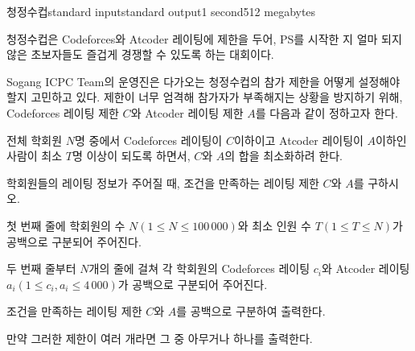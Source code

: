 \begin{problem}{청정수컵}{standard input}{standard output}{1 second}{512 megabytes}

청정수컵은 Codeforces와 Atcoder 레이팅에 제한을 두어, PS를 시작한 지 얼마 되지 않은 초보자들도 즐겁게 경쟁할 수 있도록 하는 대회이다. 

Sogang ICPC Team의 운영진은 다가오는 청정수컵의 참가 제한을 어떻게 설정해야 할지 고민하고 있다. 제한이 너무 엄격해 참가자가 부족해지는 상황을 방지하기 위해, Codeforces 레이팅 제한 $C$와 Atcoder 레이팅 제한 $A$를 다음과 같이 정하고자 한다.

전체 학회원 $N$명 중에서 Codeforces 레이팅이 $C$이하이고 Atcoder 레이팅이 $A$이하인 사람이 최소 $T$명 이상이 되도록 하면서, $C$와 $A$의 합을 최소화하려 한다.

학회원들의 레이팅 정보가 주어질 때, 조건을 만족하는 레이팅 제한 $C$와 $A$를 구하시오.

\InputFile
첫 번째 줄에 학회원의 수 $N(1 \le N \le 100\,000)$와 최소 인원 수 $T(1 \le T \le N)$가 공백으로 구분되어 주어진다.

두 번째 줄부터 $N$개의 줄에 걸쳐 각 학회원의 Codeforces 레이팅 $c_i$와 Atcoder 레이팅 $a_i(1 \le c_i, a_i \le 4\,000)$가 공백으로 구분되어 주어진다.

\OutputFile
조건을 만족하는 레이팅 제한 $C$와 $A$를 공백으로 구분하여 출력한다.

만약 그러한 제한이 여러 개라면 그 중 아무거나 하나를 출력한다.

\Example

\begin{example}
%
\end{example}

\end{problem}